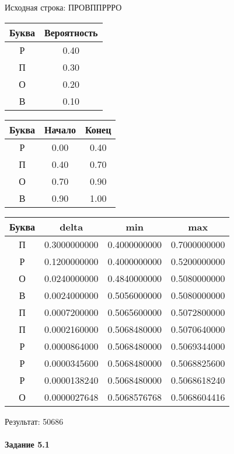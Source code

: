 \documentclass[a4paper, 12pt]{article}
\begin{document}
Исходная строка: ПРОВППРРРО\
\begin{center}
 \begin{tabular}{ |c|c| } 
  \hline
     Буква & Вероятность \\ \hline
Р & 0.40\\\hline
П & 0.30\\\hline
О & 0.20\\\hline
В & 0.10
\\ \hline \end{tabular}
\end{center}
\begin{center}
 \begin{tabular}{ |c|c|c| } 
  \hline
     Буква & Начало & Конец \\ \hline
Р & 0.00 & 0.40\\\hline
П & 0.40 & 0.70\\\hline
О & 0.70 & 0.90\\\hline
В & 0.90 & 1.00
\\ \hline \end{tabular}
\end{center}
\begin{center}
 \begin{tabular}{ |c|c|c|c| } 
  \hline
     Буква & delta & min & max \\ \hline
П & 0.3000000000 & 0.4000000000 & 0.7000000000\\\hline
Р & 0.1200000000 & 0.4000000000 & 0.5200000000\\\hline
О & 0.0240000000 & 0.4840000000 & 0.5080000000\\\hline
В & 0.0024000000 & 0.5056000000 & 0.5080000000\\\hline
П & 0.0007200000 & 0.5065600000 & 0.5072800000\\\hline
П & 0.0002160000 & 0.5068480000 & 0.5070640000\\\hline
Р & 0.0000864000 & 0.5068480000 & 0.5069344000\\\hline
Р & 0.0000345600 & 0.5068480000 & 0.5068825600\\\hline
Р & 0.0000138240 & 0.5068480000 & 0.5068618240\\\hline
О & 0.0000027648 & 0.5068576768 & 0.5068604416
\\ \hline \end{tabular}
\end{center}
Результат: 50686
\pagebreak
\paragraph{Задание 5.1 \\
}
\end{document}
